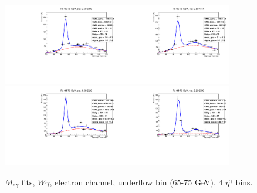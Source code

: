 \begin{figure}[htb]
  \begin{center}
   \includegraphics[width=0.45\textwidth]{../figs/figs_v11/ELECTRON_WGamma/EtoGammaFits/sa_hZmass_h_Data_EtoGamma_Enr_BARREL_pt65to75_ieta0_noWMtCut.pdf}\includegraphics[width=0.45\textwidth]{../figs/figs_v11/ELECTRON_WGamma/EtoGammaFits/sa_hZmass_h_Data_EtoGamma_Enr_BARREL_pt65to75_ieta1_noWMtCut.pdf}\\
   \includegraphics[width=0.45\textwidth]{../figs/figs_v11/ELECTRON_WGamma/EtoGammaFits/sa_hZmass_h_Data_EtoGamma_Enr_ENDCAP_pt65to75_ieta0_noWMtCut.pdf}\includegraphics[width=0.45\textwidth]{../figs/figs_v11/ELECTRON_WGamma/EtoGammaFits/sa_hZmass_h_Data_EtoGamma_Enr_ENDCAP_pt65to75_ieta1_noWMtCut.pdf}\\
  \label{fig:etogFits_65to75}
  \caption{$M_{e\gamma}$ fits, $W\gamma$, electron channel, underflow bin (65-75 GeV), 4 $\eta^{\gamma}$ bins.}
  \end{center}
\end{figure}


